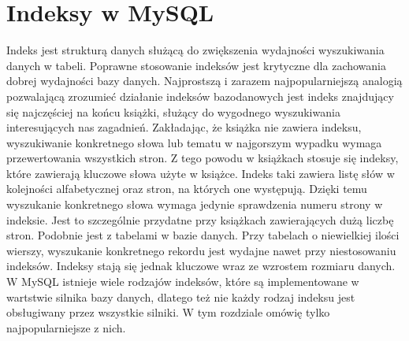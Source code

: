\section{Indeksy w MySQL}
Indeks jest strukturą danych służącą do zwiększenia wydajności wyszukiwania danych w tabeli. Poprawne stosowanie indeksów jest krytyczne dla zachowania dobrej wydajności bazy danych.
Najprostszą i zarazem najpopularniejszą analogią pozwalającą zrozumieć działanie indeksów bazodanowych jest indeks znajdujący się najczęściej na końcu książki, służący do wygodnego wyszukiwania interesujących nas zagadnień. Zakładając, że książka nie zawiera indeksu, wyszukiwanie konkretnego słowa lub tematu w najgorszym wypadku wymaga przewertowania wszystkich stron. Z tego powodu w książkach stosuje się indeksy, które zawierają kluczowe słowa użyte w książce. Indeks taki zawiera listę słów w kolejności alfabetycznej oraz stron, na których one występują. Dzięki temu wyszukanie konkretnego słowa wymaga jedynie sprawdzenia numeru strony w indeksie. Jest to szczególnie przydatne przy książkach zawierających dużą liczbę stron. Podobnie jest z tabelami w bazie danych. Przy tabelach o niewielkiej ilości wierszy, wyszukanie konkretnego rekordu jest wydajne nawet przy niestosowaniu indeksów. Indeksy stają się jednak kluczowe wraz ze wzrostem rozmiaru danych.
W MySQL istnieje wiele rodzajów indeksów, które są implementowane w wartstwie silnika bazy danych, dlatego też nie każdy rodzaj indeksu jest obsługiwany przez wszystkie silniki. W tym rozdziale omówię tylko najpopularniejsze z nich.



